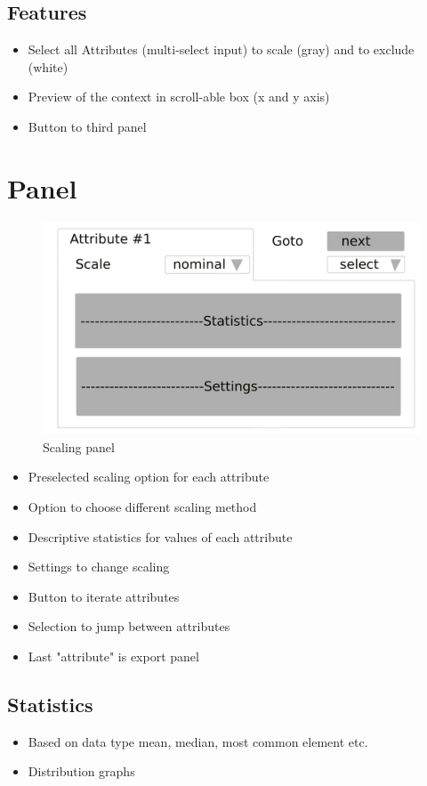 \documentclass[]{article}
\begin{document}
\subsection{Features}
\begin{itemize}
	\item Select all Attributes (multi-select input) to scale (gray) and to exclude (white)
	\item Preview of the context in scroll-able box (x and y axis)
	\item Button to third panel
\end{itemize}

\newpage
\section{Panel}
\begin{figure}[H]
	\includegraphics[width=\linewidth]{panel-3.png}
	\caption{Scaling panel}
	\label{fig:p2}
\end{figure}
\begin{itemize}
	\item Preselected scaling option for each attribute
	\item Option to choose different scaling method
	\item Descriptive statistics for values of each attribute
	\item Settings to change scaling
	\item Button to iterate attributes
	\item Selection to jump between attributes
	\item Last "attribute" is export panel
\end{itemize}

\subsection{Statistics}
\begin{itemize}
	\item Based on data type mean, median, most common element etc.
	\item Distribution graphs
\end{itemize}
\end{document}
